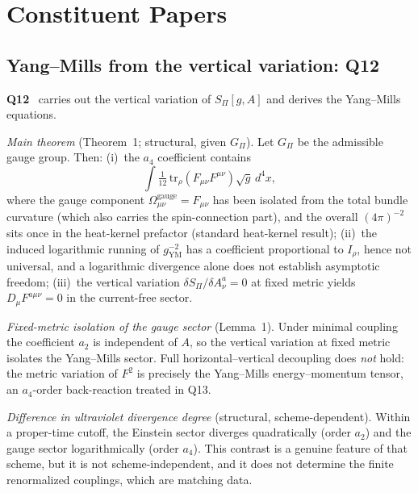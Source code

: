 \documentclass[11pt,a4paper]{article}
\theoremstyle{definition}
\newcommand{\gYM}{g_{\mathrm{YM}}}
\newcommand{\Irho}{I_\rho}
\newcommand{\SPI}{S_\Pi}
\newcommand{\Gpi}{G_\Pi}
\begin{document}
  \section{Constituent Papers}
    \label{sec:papers}

    \subsection{Yang--Mills from the vertical variation: Q12}
      \label{sec:q12}

      \textbf{Q12}~\cite{Beau2026q12} carries out the vertical variation of $\SPI[g,A]$
      and derives the Yang--Mills equations.

      \textit{Main theorem} (Theorem~1; structural, given $\Gpi$).
      Let $\Gpi$ be the admissible gauge group.
      Then: (i)~the $a_4$ coefficient contains
      \[
        \int \tfrac{1}{12}\,\mathrm{tr}_\rho(F_{\mu\nu}F^{\mu\nu})\sqrt{g}\,d^4x,
      \]
      where the gauge component $\Omega^{\mathrm{gauge}}_{\mu\nu} = F_{\mu\nu}$ has been isolated
      from the total bundle curvature (which also carries the spin-connection part), and the
      overall
      $(4\pi)^{-2}$ sits once in the heat-kernel prefactor (standard heat-kernel result);
      (ii)~the induced logarithmic running of $\gYM^{-2}$ has a coefficient
      proportional to $\Irho$, hence not universal, and a logarithmic divergence alone does
      not establish asymptotic freedom;
      (iii)~the vertical variation $\delta\SPI/\delta A^a_\nu = 0$ at fixed metric yields
      $D_\mu F^{a\mu\nu} = 0$ in the current-free sector.

      \textit{Fixed-metric isolation of the gauge sector} (Lemma~1).
      Under minimal coupling the coefficient $a_2$ is independent of $A$, so the vertical
      variation at fixed metric isolates the Yang--Mills sector.
      Full horizontal--vertical decoupling does \emph{not} hold: the metric variation of $F^2$ is
      precisely the Yang--Mills energy--momentum tensor, an $a_4$-order back-reaction treated in
      Q13.

      \textit{Difference in ultraviolet divergence degree} (structural, scheme-dependent).
      Within a proper-time cutoff, the Einstein sector diverges quadratically (order $a_2$) and
      the gauge sector logarithmically (order $a_4$).
      This contrast is a genuine feature of that scheme, but it is not scheme-independent, and it
      does not determine the finite renormalized couplings, which are matching data.
\end{document}
